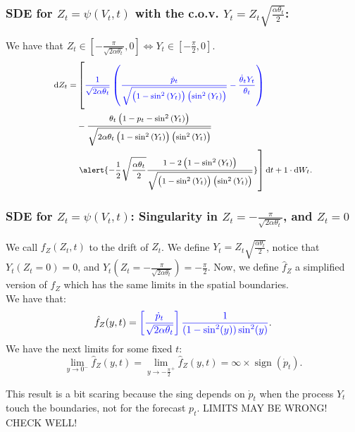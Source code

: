 \documentclass[aspectratio=169]{beamer}\usepackage[utf8]{inputenc}
\DeclareMathOperator{\sign}{sign}
\begin{document}
\begin{frame}\frametitle{SDE for $Z_t=\psi(V_t,t)$ with the c.o.v. $Y_t=Z_t\sqrt{\frac{\alpha\theta_t}{2}}$:}
We have that $Z_t\in\left[-\frac{\pi}{\sqrt{2\alpha\theta_t}},0\right]\iff Y_t\in\left[-\frac{\pi}{2},0\right]$.
\begin{equation*}
{\footnotesize
\begin{split}
\dif Z_t=&\left[{\color{blue}\frac{1}{\sqrt{2\alpha\theta_t}}\left(\frac{\dot{p}_t}{\sqrt{\left(1-\sin^2\left(Y_t\right)\right)\left(\sin^2\left(Y_t\right)\right)}}-\frac{\dot{\theta}_tY_t}{\theta_t}\right)}\right.\\
&-\frac{\theta_t\left(1-p_t-\sin^2\left(Y_t\right)\right)}{\sqrt{2\alpha\theta_t\left(1-\sin^2\left(Y_t\right)\right)\left(\sin^2\left(Y_t\right)\right)}}\\
&\left.\alert{-\frac{1}{2}\sqrt{\frac{\alpha\theta_t}{2}}\frac{1-2\left(1-\sin^2\left(Y_t\right)\right)}{\sqrt{\left(1-\sin^2\left(Y_t\right)\right)\left(\sin^2\left(Y_t\right)\right)}}}\right]\dif t+1\cdot \dif W_t.
\end{split}}
\end{equation*}

\end{frame}


\begin{frame}\frametitle{SDE for $Z_t=\psi(V_t,t)$: Singularity in $Z_t=-\frac{\pi}{\sqrt{2\alpha\theta_t}}$, and $Z_t=0$}

We call $f_Z(Z_t,t)$ to the drift of $Z_t$. We define $Y_t=Z_t\sqrt{\frac{\alpha\theta_t}{2}}$, notice that $Y_t(Z_t=0)=0$, and $Y_t\left(Z_t=-\frac{\pi}{\sqrt{2\alpha\theta_t}}\right)=-\frac{\pi}{2}$. Now, we define $\hat{f}_Z$ a simplified version of $f_Z$ which has the same limits in the spatial boundaries.\\
We have that:
\begin{equation*}
\hat{f}_Z(y,t)={\color{blue}\left[\frac{\dot{p}_t}{\sqrt{2\alpha\theta_t}}\right]\frac{1}{(1-\sin^2(y))\sin^2(y)}}.
\end{equation*}
We have the next limits for some fixed $t$:
$$\lim_{y\to0^-}\hat{f}_Z(y,t)=\lim_{y\to-\frac{\pi}{2}^+}\hat{f}_Z(y,t)=\infty\times\sign(\dot{p}_t).$$

\alert{This result is a bit scaring because the sing depends on $\dot{p}_t$ when the process $Y_t$ touch the boundaries, not for the forecast $p_t$. LIMITS MAY BE WRONG! CHECK WELL!}

\end{frame}
\end{document}
